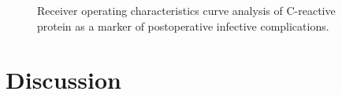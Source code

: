 \begin{figure}[t]
	\caption{Receiver operating characteristics curve analysis of C-reactive protein as a marker of postoperative infective complications.}
	\label{fig:crp_comp_ROC_infection}
	
\end{figure}




\clearpage
\section{Discussion}